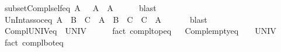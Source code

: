\begin{isabellebody}
\isanewline
{}\isamarkupfalse%
\ subset{\isacharunderscore}{\kern0pt}Compl{\isacharunderscore}{\kern0pt}self{\isacharunderscore}{\kern0pt}eq{\isacharcolon}{\kern0pt}\ {\isachardoublequoteopen}A\ {\isasymsubseteq}\ {\isacharminus}{\kern0pt}\ A\ {\isasymlongleftrightarrow}\ A\ {\isacharequal}{\kern0pt}\ {\isacharbraceleft}{\kern0pt}{\isacharbraceright}{\kern0pt}{\isachardoublequoteclose}\isanewline
%
\isadelimproof
\ \ %
\endisadelimproof
%
\isatagproof
{}\isamarkupfalse%
\ blast%
\endisatagproof
{\isafoldproof}%
%
\isadelimproof
\isanewline
%
\endisadelimproof
\isanewline
{}\isamarkupfalse%
\ Un{\isacharunderscore}{\kern0pt}Int{\isacharunderscore}{\kern0pt}assoc{\isacharunderscore}{\kern0pt}eq{\isacharcolon}{\kern0pt}\ {\isachardoublequoteopen}{\isacharparenleft}{\kern0pt}A\ {\isasyminter}\ B{\isacharparenright}{\kern0pt}\ {\isasymunion}\ C\ {\isacharequal}{\kern0pt}\ A\ {\isasyminter}\ {\isacharparenleft}{\kern0pt}B\ {\isasymunion}\ C{\isacharparenright}{\kern0pt}\ {\isasymlongleftrightarrow}\ C\ {\isasymsubseteq}\ A{\isachardoublequoteclose}\isanewline
\ \ %
\isanewline
%
\isadelimproof
\ \ %
\endisadelimproof
%
\isatagproof
{}\isamarkupfalse%
\ blast%
\endisatagproof
{\isafoldproof}%
%
\isadelimproof
\isanewline
%
\endisadelimproof
\isanewline
{}\isamarkupfalse%
\ Compl{\isacharunderscore}{\kern0pt}UNIV{\isacharunderscore}{\kern0pt}eq{\isacharcolon}{\kern0pt}\ {\isachardoublequoteopen}{\isacharminus}{\kern0pt}\ UNIV\ {\isacharequal}{\kern0pt}\ {\isacharbraceleft}{\kern0pt}{\isacharbraceright}{\kern0pt}{\isachardoublequoteclose}\isanewline
%
\isadelimproof
\ \ %
\endisadelimproof
%
\isatagproof
{}\isamarkupfalse%
\ {\isacharparenleft}{\kern0pt}fact\ compl{\isacharunderscore}{\kern0pt}top{\isacharunderscore}{\kern0pt}eq{\isacharparenright}{\kern0pt}%
\endisatagproof
{\isafoldproof}%
%
\isadelimproof
%
\endisadelimproof
\ \isanewline
\isanewline
{}\isamarkupfalse%
\ Compl{\isacharunderscore}{\kern0pt}empty{\isacharunderscore}{\kern0pt}eq{\isacharcolon}{\kern0pt}\ {\isachardoublequoteopen}{\isacharminus}{\kern0pt}\ {\isacharbraceleft}{\kern0pt}{\isacharbraceright}{\kern0pt}\ {\isacharequal}{\kern0pt}\ UNIV{\isachardoublequoteclose}\isanewline
%
\isadelimproof
\ \ %
\endisadelimproof
%
\isatagproof
{}\isamarkupfalse%
\ {\isacharparenleft}{\kern0pt}fact\ compl{\isacharunderscore}{\kern0pt}bot{\isacharunderscore}{\kern0pt}eq{\isacharparenright}{\kern0pt}%
\endisatagproof
{\isafoldproof}%
%
\isadelimproof

\end{isabellebody}
